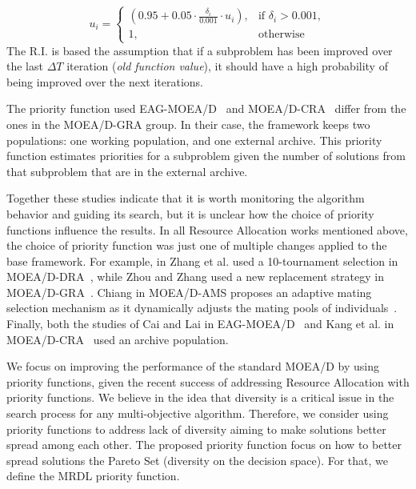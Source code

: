 \[
u_i= 
\begin{cases}

(0.95 + 0.05 \cdot \frac{\delta_i}{0.001} \cdot u_i), & \text{if } \delta_i > 0.001,
\\
1,              & \text{otherwise}

\end{cases}\label{priority2}
\]
The R.I. is based the assumption that if a subproblem has been improved over the last $\Delta T$ iteration (\textit{old function value}), it should have a high probability of being improved over the next iterations. 

The priority function used EAG-MOEA/D~\cite{cai2015external} and MOEA/D-CRA~\cite{kang2018collaborative} differ from the ones in the MOEA/D-GRA group. In their case, the framework keeps two populations: one working population, and one external archive. This priority function estimates priorities for a subproblem given the number of solutions from that subproblem that are in the external archive.

Together these studies indicate that it is worth monitoring the algorithm behavior and guiding its search, but it is unclear how the choice of priority functions influence the results. In all Resource Allocation works mentioned above, the choice of priority function was just one of multiple changes applied to the base framework. For example, in Zhang et al. used a 10-tournament selection in MOEA/D-DRA~\cite{zhang2009performance}, while Zhou and Zhang used a new replacement strategy in MOEA/D-GRA~\cite{zhou2016all}. Chiang in MOEA/D-AMS proposes an adaptive mating selection mechanism as it dynamically adjusts the mating pools of individuals~\cite{chiang2011moea}. Finally, both the studies of Cai and Lai in  EAG-MOEA/D~\cite{cai2015external} and Kang et al. in MOEA/D-CRA~\cite{kang2018collaborative} used an archive population.

We focus on improving the performance of the standard MOEA/D by using priority functions, given the recent success of addressing Resource Allocation with priority functions. We believe in the idea that diversity is a critical issue in the search process for any multi-objective algorithm. Therefore, we consider using priority functions to address lack of diversity aiming to make solutions better spread among each other. The proposed priority function focus on how to better spread solutions the Pareto Set (diversity on the decision space). For that, we define the MRDL priority function.



